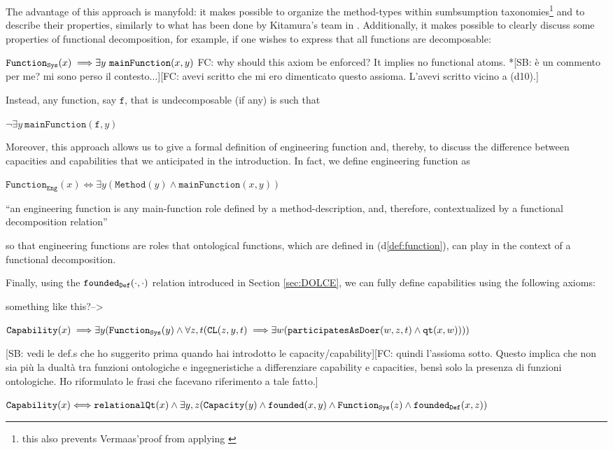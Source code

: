 \documentclass[sw]{iosart2x}
\newcommand{\bflist}{\begin{list}{}{\setlength{\topsep}{2mm}\setlength{\partopsep}{0mm}\setlength{\parsep}{0mm}\setlength{\leftmargin}{9mm}\setlength{\labelwidth}{8mm}}}
\newcommand{\eflist}{\end{list}}
\newcommand{\AxLabel}{\textrm{a}}
\newcommand{\DefLabel}{\textrm{d}}
\newcommand{\ExLabel}{\textrm{ex}}
\newcounter{cntax}
\newcommand{\myax}[1]{\refstepcounter{cntax}\begin{small}{\bf \AxLabel\thecntax\label{ax:#1}}\end{small}}
\newcounter{cntdef}
\newcommand{\mydf}[1]{\refstepcounter{cntdef}\begin{small}{\bf \DefLabel\thecntdef\label{def:#1}}\end{small}}
\newcommand{\myex}[1]{\refstepcounter{cntex}\begin{small}{\bf \ExLabel\thecntex\label{ex:#1}}\end{small}}
\newcounter{cntex}
\newcommand{\mytext}[1]{``#1''}
\newcommand{\refdf}[1]{({\DefLabel}\ref{#1})}
\newcommand{\generalStyle}[1]{\texttt{#1}}
\newcommand{\biRel}[3]{\generalStyle{#1}(#2,#3)}
\newcommand{\uniRel}[2]{\generalStyle{#1}(#2)}
\newcommand{\uniRelPar}[3]{\generalStyle{#1}_{\generalStyle{#3}}(#2)}
\newcommand{\biRelPar}[4]{\generalStyle{#1}_{\generalStyle{#4}}(#2,#3)}
\newcommand{\triRel}[4]{\generalStyle{#1}(#2,#3,#4)}
\newcommand{\cst}[1]{\ensuremath{\mathtt{#1}}}
\newcommand{\myiff}{\Longleftrightarrow}
\newcommand{\myfi}{\hspace{0.9mm} \Longrightarrow}
\newcommand{\DOLCEQualityDirect}[2]{\biRel{qt}{#1}{#2}}
\newcommand{\DOLCECLby}[3]{\triRel{CL}{#1}{#2}{#3}}
\newcommand{\Capability}[1]{\uniRel{Capability}{#1}}
\newcommand{\Capacity}[1]{\uniRel{Capacity}{#1}}
\newcommand{\RelationalQuality}[1]{\uniRel{relationalQt}{#1}}
\newcommand{\Method}[1]{\uniRel{Method}{#1}}
\newcommand{\FunctionSys}[1]{\uniRelPar{Function}{#1}{Sys}}
\newcommand{\FunctionEng}[1]{\uniRelPar{Function}{#1}{Eng}}
\newcommand{\founded}[2]{\biRel{\foundedTerm{passive}}{#1}{#2}}
\newcommand{\participateAsDoer}[3]{\triRel{participatesAsDoer}{#1}{#2}{#3}}
\newcommand{\mainFunction}[2]{\biRel{mainFunction}{#1}{#2}}
\newcommand{\foundedDef}[2]{\biRelPar{\foundedTerm{passive}}{#1}{#2}{Def}}
\newcommand{\foundedTerm}[1]{%
  \ifthenelse{\equal{#1}{passive}}{founded}{%
    \ifthenelse{\equal{#1}{verb}}{found}{%
      \ifthenelse{\equal{#1}{gerund}}{founding}{%
        ERROR!%
      }%
    }%
  }%
}
\newcommand{\TODO}[1]{{\color{red} #1}}
\begin{document}
The advantage of this approach is manyfold: it makes  possible to organize the method-types within sumbsumption taxonomies\footnote{this also prevents Vermaas'proof from applying \cite{vermaasFormalImpossibilityAnalysing2013}} and to describe their properties, similarly to what has been done by Kitamura's team in  \cite{kitamuraOntologybasedDescriptionFunctional2003}.
Additionally, it makes possible to clearly discuss some properties of functional decomposition, for example, if one wishes to express that all functions are decomposable:
\bflist
\item[\myex{noAtomsFunctions}] $\FunctionSys{x} \myfi \exists y~ \mainFunction{x}{y}$ \TODO{FC: why should this axiom be enforced? It implies no functional atoms. *[SB: è un commento per me? mi sono perso il contesto...][FC: avevi scritto che mi ero dimenticato questo assioma. L'avevi scritto vicino a (d10).]}
\eflist
Instead, any function, say $\cst{f}$, that is undecomposable (if any) is such that
\bflist
\item[\myex{yesAtomsFunctions}] $\neg \exists y~\mainFunction{\cst{f}}{y}$
\eflist
Moreover, this approach allows us to give a formal definition of engineering function and, thereby, to discuss the difference between capacities and capabilities that we anticipated in the introduction. 
In fact, we define engineering function as
\bflist
  \item[\mydf{engfunction}]  $ \FunctionEng{x} \myiff \exists y (\Method{y} \land \mainFunction{x}{y}) $
  \item[] \mytext{an engineering function is any main-function role defined by a method-description, and, therefore, contextualized by a functional decomposition relation}
\eflist
so that engineering functions are roles that ontological functions, which are defined in \refdf{def:function}, can play in the context of a functional decomposition.

Finally, using the $\foundedDef{\cdot}{\cdot}$ relation introduced in Section \ref{sec:DOLCE}, we can fully define capabilities using the following axioms:
\TODO{something like this?-->
\bflist
  \item[\myax{capabilityCostrTris}] $ \Capability{x} \myfi \exists y (\FunctionSys{y} \land \forall z,t(\DOLCECLby{z}{y}{t} \myfi \exists w(\participateAsDoer{w}{z}{t} \land \DOLCEQualityDirect{x}{w})))$
\eflist
}
\TODO{[SB: vedi le def.s che ho suggerito prima quando hai introdotto le capacity/capability][FC: quindi l'assioma sotto. Questo implica che non sia più la dualtà tra funzioni ontologiche e ingegneristiche a differenziare capability e capacities, bensì solo la presenza di funzioni ontologiche. Ho riformulato le frasi che facevano riferimento a tale fatto.]}
\bflist
\item[\mydf{capability}] $ \Capability{x} \myiff  \RelationalQuality{x} \land \exists y,z(\Capacity{y} \land \founded{x}{y} \land \FunctionSys{z} \land \foundedDef{x}{z}) $  
\eflist
\end{document}
